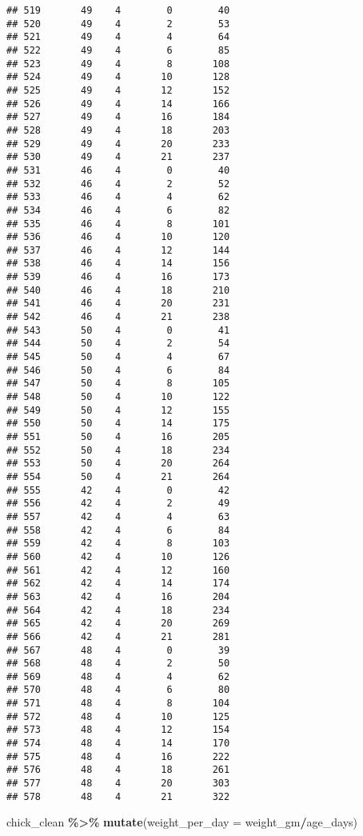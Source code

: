 \documentclass[
]{article}
\newenvironment{Shaded}{\begin{snugshade}}{\end{snugshade}}
\newcommand{\AttributeTok}[1]{\textcolor[rgb]{0.13,0.29,0.53}{#1}}
\newcommand{\FunctionTok}[1]{\textcolor[rgb]{0.13,0.29,0.53}{\textbf{#1}}}
\newcommand{\NormalTok}[1]{#1}
\newcommand{\SpecialCharTok}[1]{\textcolor[rgb]{0.81,0.36,0.00}{\textbf{#1}}}
\begin{document}
\begin{verbatim}
## 519       49    4        0        40
## 520       49    4        2        53
## 521       49    4        4        64
## 522       49    4        6        85
## 523       49    4        8       108
## 524       49    4       10       128
## 525       49    4       12       152
## 526       49    4       14       166
## 527       49    4       16       184
## 528       49    4       18       203
## 529       49    4       20       233
## 530       49    4       21       237
## 531       46    4        0        40
## 532       46    4        2        52
## 533       46    4        4        62
## 534       46    4        6        82
## 535       46    4        8       101
## 536       46    4       10       120
## 537       46    4       12       144
## 538       46    4       14       156
## 539       46    4       16       173
## 540       46    4       18       210
## 541       46    4       20       231
## 542       46    4       21       238
## 543       50    4        0        41
## 544       50    4        2        54
## 545       50    4        4        67
## 546       50    4        6        84
## 547       50    4        8       105
## 548       50    4       10       122
## 549       50    4       12       155
## 550       50    4       14       175
## 551       50    4       16       205
## 552       50    4       18       234
## 553       50    4       20       264
## 554       50    4       21       264
## 555       42    4        0        42
## 556       42    4        2        49
## 557       42    4        4        63
## 558       42    4        6        84
## 559       42    4        8       103
## 560       42    4       10       126
## 561       42    4       12       160
## 562       42    4       14       174
## 563       42    4       16       204
## 564       42    4       18       234
## 565       42    4       20       269
## 566       42    4       21       281
## 567       48    4        0        39
## 568       48    4        2        50
## 569       48    4        4        62
## 570       48    4        6        80
## 571       48    4        8       104
## 572       48    4       10       125
## 573       48    4       12       154
## 574       48    4       14       170
## 575       48    4       16       222
## 576       48    4       18       261
## 577       48    4       20       303
## 578       48    4       21       322
\end{verbatim}

\begin{Shaded}
\begin{Highlighting}[]
\NormalTok{chick\_clean }\SpecialCharTok{\%\textgreater{}\%}
  \FunctionTok{mutate}\NormalTok{(}\AttributeTok{weight\_per\_day =}\NormalTok{ weight\_gm}\SpecialCharTok{/}\NormalTok{age\_days)}
\end{Highlighting}
\end{Shaded}
\end{document}
